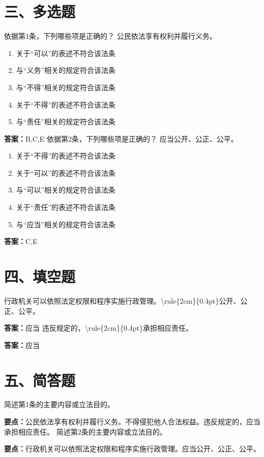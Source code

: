 \documentclass[12pt]{ctexart}
\begin{document}
\section*{三、多选题}
\begin{questions}
\question 依据第1条，下列哪些项是正确的？
公民依法享有权利并履行义务。
\begin{enumerate}[label=\Alph*.]
\item 关于“可以”的表述不符合该法条
\item 与“义务”相关的规定符合该法条
\item 与“不得”相关的规定符合该法条
\item 关于“不得”的表述不符合该法条
\item 与“责任”相关的规定符合该法条
\end{enumerate}
\ifprintanswers\par\textbf{答案：}B,C,E\fi
\question 依据第2条，下列哪些项是正确的？
应当公开、公正、公平。
\begin{enumerate}[label=\Alph*.]
\item 关于“不得”的表述不符合该法条
\item 关于“可以”的表述不符合该法条
\item 与“可以”相关的规定符合该法条
\item 关于“责任”的表述不符合该法条
\item 与“应当”相关的规定符合该法条
\end{enumerate}
\ifprintanswers\par\textbf{答案：}C,E\fi
\end{questions}
\section*{四、填空题}
\begin{questions}
\question 行政机关可以依照法定权限和程序实施行政管理。\textbackslash{}rule\{2cm\}\{0.4pt\}公开、公正、公平。
\ifprintanswers\par\textbf{答案：}应当\fi
\question 违反规定的，\textbackslash{}rule\{2cm\}\{0.4pt\}承担相应责任。
\ifprintanswers\par\textbf{答案：}应当\fi
\end{questions}
\section*{五、简答题}
\begin{questions}
\question 简述第1条的主要内容或立法目的。
\ifprintanswers\par\textbf{要点：}公民依法享有权利并履行义务。不得侵犯他人合法权益。违反规定的，应当承担相应责任。\fi
\question 简述第2条的主要内容或立法目的。
\ifprintanswers\par\textbf{要点：}行政机关可以依照法定权限和程序实施行政管理。应当公开、公正、公平。\fi
\end{questions}
\end{document}
